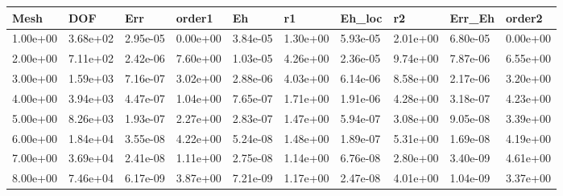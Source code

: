 \begin{tabular}{llllllllll}
Mesh & DOF & Err & order1 & Eh & r1 & Eh_loc & r2 & Err_Eh & order2 \\ 
\hline 
1.00e+00 & 3.68e+02 & 2.95e-05 & 0.00e+00 & 3.84e-05 & 1.30e+00 & 5.93e-05 & 2.01e+00 & 6.80e-05 & 0.00e+00 \\ 
2.00e+00 & 7.11e+02 & 2.42e-06 & 7.60e+00 & 1.03e-05 & 4.26e+00 & 2.36e-05 & 9.74e+00 & 7.87e-06 & 6.55e+00 \\ 
3.00e+00 & 1.59e+03 & 7.16e-07 & 3.02e+00 & 2.88e-06 & 4.03e+00 & 6.14e-06 & 8.58e+00 & 2.17e-06 & 3.20e+00 \\ 
4.00e+00 & 3.94e+03 & 4.47e-07 & 1.04e+00 & 7.65e-07 & 1.71e+00 & 1.91e-06 & 4.28e+00 & 3.18e-07 & 4.23e+00 \\ 
5.00e+00 & 8.26e+03 & 1.93e-07 & 2.27e+00 & 2.83e-07 & 1.47e+00 & 5.94e-07 & 3.08e+00 & 9.05e-08 & 3.39e+00 \\ 
6.00e+00 & 1.84e+04 & 3.55e-08 & 4.22e+00 & 5.24e-08 & 1.48e+00 & 1.89e-07 & 5.31e+00 & 1.69e-08 & 4.19e+00 \\ 
7.00e+00 & 3.69e+04 & 2.41e-08 & 1.11e+00 & 2.75e-08 & 1.14e+00 & 6.76e-08 & 2.80e+00 & 3.40e-09 & 4.61e+00 \\ 
8.00e+00 & 7.46e+04 & 6.17e-09 & 3.87e+00 & 7.21e-09 & 1.17e+00 & 2.47e-08 & 4.01e+00 & 1.04e-09 & 3.37e+00 \\ 
\hline 
\end{tabular}